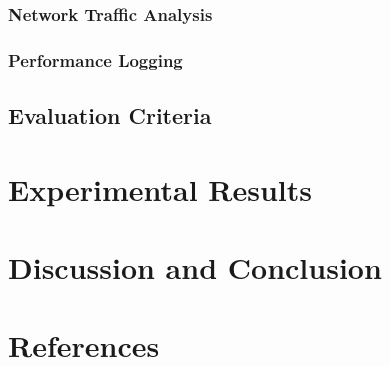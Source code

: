 \documentclass[11pt]{article}
\begin{document}
				\subsubsection{Network Traffic Analysis}
				\subsubsection{Performance Logging}
			\subsection{Evaluation Criteria}

		\section{Experimental Results}
		\section{Discussion and Conclusion}
		\section{References}
		
	
\end{document}
